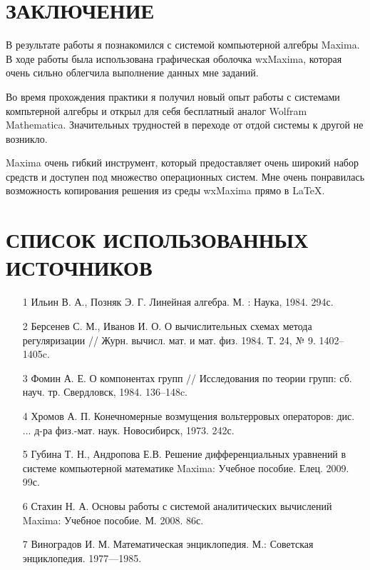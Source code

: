\documentclass[article, bachelor, och, pract]{SCWorks}
\begin{document}
\section*{ЗАКЛЮЧЕНИЕ}
В результате работы я познакомился с системой компьютерной алгебры Maxima. В ходе работы была использована графическая оболочка wxMaxima, которая очень сильно облегчила выполнение данных мне заданий.

Во время прохождения практики я получил новый опыт работы с системами компьтерной алгебры и открыл для себя бесплатный аналог Wolfram Mathematica. Значительных трудностей в переходе от отдой системы к другой не возникло. 

Maxima очень гибкий инструмент, который предоставляет очень широкий набор средств и доступен под множество операционных систем. Мне очень понравилась возможность копирования решения из среды wxMaxima прямо в \LaTeX. 



\section*{СПИСОК ИСПОЛЬЗОВАННЫХ ИСТОЧНИКОВ}
\begin{itemize}
\item[1] Ильин В. А., Позняк Э. Г. Линейная алгебра. М. : Наука, 1984. 294с.
\item[2] Берсенев С. М., Иванов И. О. О вычислительных схемах метода регуляризации  // Журн. вычисл. мат. и мат. физ. 1984. Т. 24, № 9. 1402–1405c. 
\item[3] Фомин А. Е. О компонентах групп // Исследования по теории групп: сб. науч. тр. Свердловск, 1984. 136–148c.
\item[4] Хромов А. П. Конечномерные возмущения вольтерровых операторов: дис. ... д-ра физ.-мат. наук. Новосибирск, 1973. 242с.
\item[5] Губина Т. Н., Андропова Е.В. Решение дифференциальных уравнений в системе компьютерной математике Maxima: Учебное пособие. Елец. 2009. 99с.
\item[6] Стахин Н. А. Основы работы с системой аналитических вычислений Maxima: Учебное пособие. М. 2008. 86с.
\item[7] Виноградов И. М. Математическая энциклопедия. М.: Советская энциклопедия. 1977—1985.
\end{itemize}
\end{document}
